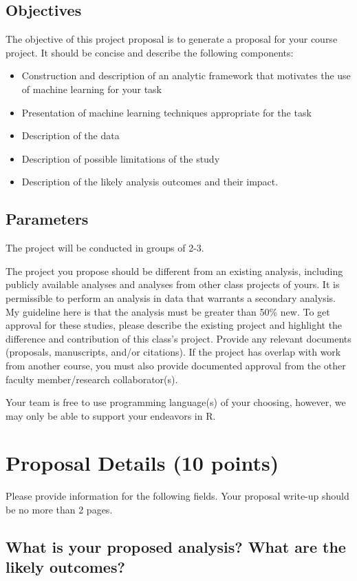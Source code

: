 \documentclass[twoside,11pt]{article}
\begin{document}
\subsection{Objectives}
The objective of this project proposal is to generate a proposal for your course project. It should be concise and describe the following components:
\begin{itemize}
\item Construction and description of an analytic framework that motivates the use of machine learning for your task
\item Presentation of machine learning techniques appropriate for the task
\item Description of the data
\item Description of possible limitations of the study
\item Description of the likely analysis outcomes and their impact.
\end{itemize}

\subsection{Parameters}
The project will be conducted in groups of 2-3.

The project you propose should be different from an existing analysis, including publicly available analyses and analyses from other class projects of yours. It is permissible to perform an analysis in data that warrants a secondary analysis. My guideline here is that the analysis must be greater than 50\% new. To get approval for these studies, please describe the existing project and highlight the difference and contribution of this class's project. Provide any relevant documents (proposals, manuscripts, and/or citations). If the project has overlap with work from another course, you must also provide documented approval from the other faculty member/research collaborator(s). 

Your team is free to use programming language(s) of your choosing, however, we may only be able to support your endeavors in R.

\section{Proposal Details (10 points)} \label{details}
Please provide information for the following fields. Your proposal write-up should be no more than 2 pages.

\subsection{What is your proposed analysis? What are the likely outcomes?}
\end{document}
